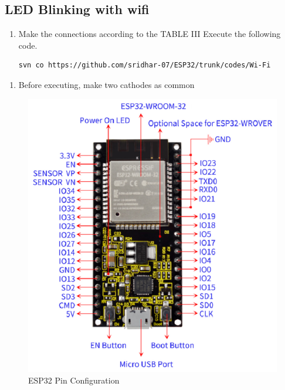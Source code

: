 \documentclass[journal,12pt,twocolumn]{IEEEtran}
\begin{document}
\subsection{LED Blinking with wifi}
\begin{enumerate}
\item Make the connections according to the TABLE III Execute the following code.
\begin{lstlisting}
svn co https://github.com/sridhar-07/ESP32/trunk/codes/Wi-Fi
\end{lstlisting}
\end{enumerate}
\begin{enumerate}
\item Before executing, make two cathodes as common 
\begin{table}[!h]
\centering

\caption{}
\label{table:pins}
\end{table}
\end{enumerate}
\begin{figure}[!h]
\centering
\includegraphics[width=\columnwidth]{./figs/esp32.eps}
\caption{ESP32 Pin Configuration}
\label{fig:arduino}
\end{figure}
\end{document}
